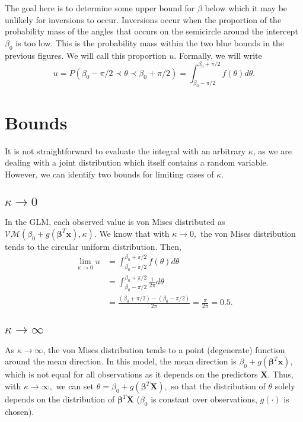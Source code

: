 \documentclass[12pt,a4paper]{article}\usepackage[]{graphicx}\usepackage[]{color}
\begin{document}
The goal here is to determine some upper bound for $\beta$ below which it may be unlikely for inversions to occur. Inversions occur when the proportion of the probability mass of the angles that occurs on the semicircle around the intercept $\beta_0$ is too low. This is the probability mass within the two blue bounds in the previous figures. We will call this proportion $u$.  Formally, we will write
$$ u = P(\beta_0 - \pi / 2 \prec \theta \prec \beta_0 + \pi / 2) = \int_{\beta_0 - \pi / 2}^{\beta_0 + \pi / 2} f(\theta) d \theta.$$

\section{Bounds}

It is not straightforward to evaluate the integral with an arbitrary $\kappa$, as we are dealing with a joint distribution which itself contains a random variable. However, we can identify two bounds for limiting cases of $\kappa$.

\subsection{$\kappa \to 0$}

In the GLM, each observed value is von Mises distributed as $ \mathcal{VM} (\beta_0 + g ( \boldsymbol\beta^T \boldsymbol{x}), \kappa).$ We know that with $ \kappa \to 0,$ the von Mises distribution tends to the circular uniform distribution. Then,
\begin{align}
\lim_{\kappa\to 0} u &= \int_{\beta_0 - \pi / 2}^{\beta_0 + \pi / 2} f(\theta) d \theta \\
&= \int_{\beta_0 - \pi / 2}^{\beta_0 + \pi / 2} \frac{1}{2 \pi} d \theta \\
&= \frac{(\beta_0 + \pi / 2) - (\beta_0 - \pi / 2)}{2 \pi} = \frac{\pi}{2\pi} = 0.5.
\end{align}

\subsection{$\kappa \to \infty$}

As $\kappa \to \infty$, the von Mises distribution tends to a point (degenerate) function around the mean direction. In this model, the mean direction is $\beta_0 + g ( \boldsymbol\beta^T \boldsymbol{x} )$, which is not equal for all observations as it depends on the predictors $\boldsymbol{X}$. Thus, with $\kappa \to \infty,$ we can set $\theta = \beta_0 + g ( \boldsymbol\beta^T \boldsymbol{X}),$ so that the distribution of $\theta$ solely depends on the distribution of $\boldsymbol\beta^T \boldsymbol{X}$ ($\beta_0$ is constant over observations, $g( \cdot )$ is chosen).
\end{document}
